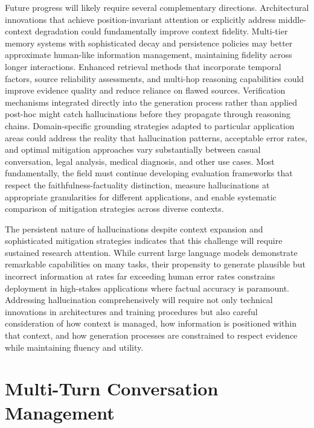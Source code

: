 \documentclass[11pt,letterpaper]{article}
\begin{document}
Future progress will likely require several complementary directions. Architectural innovations that achieve position-invariant attention or explicitly address middle-context degradation could fundamentally improve context fidelity. Multi-tier memory systems with sophisticated decay and persistence policies may better approximate human-like information management, maintaining fidelity across longer interactions. Enhanced retrieval methods that incorporate temporal factors, source reliability assessments, and multi-hop reasoning capabilities could improve evidence quality and reduce reliance on flawed sources. Verification mechanisms integrated directly into the generation process rather than applied post-hoc might catch hallucinations before they propagate through reasoning chains. Domain-specific grounding strategies adapted to particular application areas could address the reality that hallucination patterns, acceptable error rates, and optimal mitigation approaches vary substantially between casual conversation, legal analysis, medical diagnosis, and other use cases. Most fundamentally, the field must continue developing evaluation frameworks that respect the faithfulness-factuality distinction, measure hallucinations at appropriate granularities for different applications, and enable systematic comparison of mitigation strategies across diverse contexts.

The persistent nature of hallucinations despite context expansion and sophisticated mitigation strategies indicates that this challenge will require sustained research attention. While current large language models demonstrate remarkable capabilities on many tasks, their propensity to generate plausible but incorrect information at rates far exceeding human error rates constrains deployment in high-stakes applications where factual accuracy is paramount. Addressing hallucination comprehensively will require not only technical innovations in architectures and training procedures but also careful consideration of how context is managed, how information is positioned within that context, and how generation processes are constrained to respect evidence while maintaining fluency and utility.


\section{Multi-Turn Conversation Management}
\label{sec:multiturn}
\end{document}
